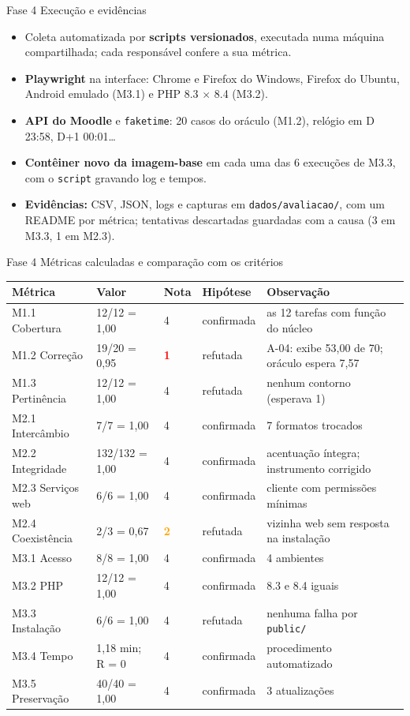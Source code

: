 \documentclass[aspectratio=169,10pt]{beamer}
\begin{document}
\begin{frame}{Fase 4 \textperiodcentered{} Execução e evidências}
\small
\begin{itemize}
\item Coleta automatizada por \textbf{scripts versionados}, executada numa máquina compartilhada; cada responsável confere a sua métrica.
\item \textbf{Playwright} na interface: Chrome e Firefox do Windows, Firefox do Ubuntu, Android emulado (M3.1) e PHP 8.3 $\times$ 8.4 (M3.2).
\item \textbf{API do Moodle} e \texttt{faketime}: 20 casos do oráculo (M1.2), relógio em D 23:58, D+1 00:01…
\item \textbf{Contêiner novo da imagem-base} em cada uma das 6 execuções de M3.3, com o \texttt{script} gravando log e tempos.
\item \textbf{Evidências:} CSV, JSON, logs e capturas em \texttt{dados/avaliacao/}, com um README por métrica; tentativas descartadas guardadas com a causa (3 em M3.3, 1 em M2.3).
\end{itemize}
\end{frame}

\begin{frame}{Fase 4 \textperiodcentered{} Métricas calculadas e comparação com os critérios}
\scriptsize
\begin{tabularx}{\linewidth}{p{2.6cm}p{2.3cm}p{0.6cm}p{1.8cm}L}
\toprule
Métrica & Valor & Nota & Hipótese & Observação \\
\midrule
M1.1 Cobertura & 12/12 = 1,00 & 4 & confirmada & as 12 tarefas com função do núcleo \\
M1.2 Correção & 19/20 = 0,95 & \textcolor{red}{\textbf{1}} & refutada & A-04: exibe 53,00 de 70; oráculo espera 7,57 \\
M1.3 Pertinência & 12/12 = 1,00 & 4 & refutada & nenhum contorno (esperava 1) \\
M2.1 Intercâmbio & 7/7 = 1,00 & 4 & confirmada & 7 formatos trocados \\
M2.2 Integridade & 132/132 = 1,00 & 4 & confirmada & acentuação íntegra; instrumento corrigido \\
M2.3 Serviços web & 6/6 = 1,00 & 4 & confirmada & cliente com permissões mínimas \\
M2.4 Coexistência & 2/3 = 0,67 & \textcolor{orange}{\textbf{2}} & refutada & vizinha web sem resposta na instalação \\
M3.1 Acesso & 8/8 = 1,00 & 4 & confirmada & 4 ambientes \\
M3.2 PHP & 12/12 = 1,00 & 4 & confirmada & 8.3 e 8.4 iguais \\
M3.3 Instalação & 6/6 = 1,00 & 4 & refutada & nenhuma falha por \texttt{public/} \\
M3.4 Tempo & 1,18 min; R = 0 & 4 & confirmada & procedimento automatizado \\
M3.5 Preservação & 40/40 = 1,00 & 4 & confirmada & 3 atualizações \\
\bottomrule
\end{tabularx}
\end{frame}
\end{document}
